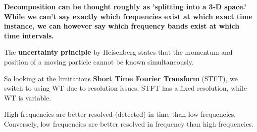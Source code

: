 \documentclass{article}
\begin{document}
		\textbf{Decomposition can be thought roughly as 'splitting into a 3-D space.' While we can't say exactly which frequencies exist at which exact time instance, we can however say which frequency bands exist at which time intervals.}
		
		The \textbf{uncertainty principle} by Heisenberg states that the momentum and position of a moving particle cannot be known simultaneously. 
		
		So looking at the limitations \textbf{Short Time Fourier Transform} (STFT), we switch to using WT due to resolution issues. STFT has a fixed resolution, while WT is variable. 
		
		High frequencies are better resolved (detected) in time than low frequencies. Conversely, low frequencies are better resolved in frequency than high frequencies.
		
	
	
	
\end{document}

